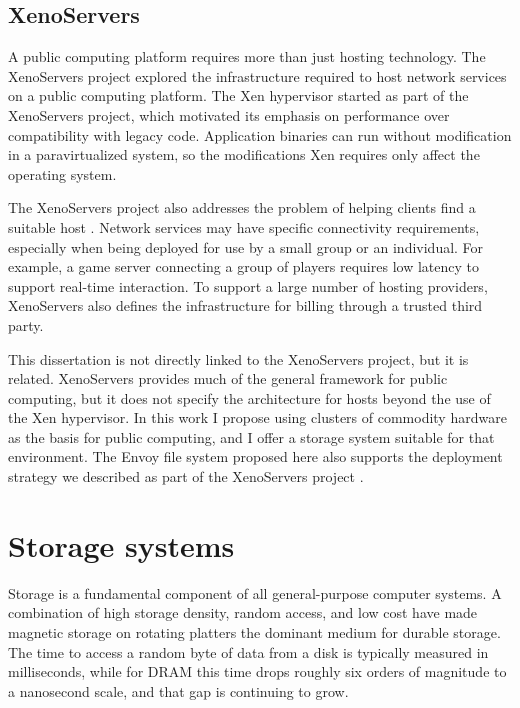 \subsection{XenoServers}

A public computing platform requires more than just hosting technology. The XenoServers project \cite{reed,kotsovinos04a} explored the infrastructure required to host network services on a public computing platform. The Xen hypervisor started as part of the XenoServers project, which motivated its emphasis on performance over compatibility with legacy code. Application binaries can run without modification in a paravirtualized system, so the modifications Xen requires only affect the operating system.

The XenoServers project also addresses the problem of helping clients find a suitable host \cite{spence}. Network services may have specific connectivity requirements, especially when being deployed for use by a small group or an individual. For example, a game server connecting a group of players requires low latency to support real-time interaction. To support a large number of hosting providers, XenoServers also defines the infrastructure for billing through a trusted third party.

This dissertation is not directly linked to the XenoServers project, but it is related. XenoServers provides much of the general framework for public computing, but it does not specify the architecture for hosts beyond the use of the Xen hypervisor. In this work I propose using clusters of commodity hardware as the basis for public computing, and I offer a storage system suitable for that environment. The Envoy file system proposed here also supports the deployment strategy we described as part of the XenoServers project \cite{kotsovinos04b}.

\section{Storage systems}

Storage is a fundamental component of all general-purpose computer systems. A combination of high storage density, random access, and low cost have made magnetic storage on rotating platters the dominant medium for durable storage. The time to access a random byte of data from a disk is typically measured in milliseconds, while for DRAM this time drops roughly six orders of magnitude to a nanosecond scale, and that gap is continuing to grow.

